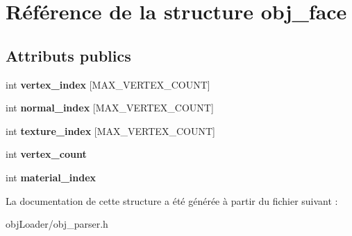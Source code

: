 \hypertarget{structobj__face}{\section{Référence de la structure obj\-\_\-face}
\label{structobj__face}
}
\subsection*{Attributs publics}
\begin{DoxyCompactItemize}
\item 
\hypertarget{structobj__face_a507982facfb73bcd3143d962e8aba781}{int {\bfseries vertex\-\_\-index} \mbox{[}M\-A\-X\-\_\-\-V\-E\-R\-T\-E\-X\-\_\-\-C\-O\-U\-N\-T\mbox{]}}\label{structobj__face_a507982facfb73bcd3143d962e8aba781}

\item 
\hypertarget{structobj__face_aa37ed96ceb21dde7ca0e07436f0c60bd}{int {\bfseries normal\-\_\-index} \mbox{[}M\-A\-X\-\_\-\-V\-E\-R\-T\-E\-X\-\_\-\-C\-O\-U\-N\-T\mbox{]}}\label{structobj__face_aa37ed96ceb21dde7ca0e07436f0c60bd}

\item 
\hypertarget{structobj__face_affde6e39f099c5f3497c3691ea66608c}{int {\bfseries texture\-\_\-index} \mbox{[}M\-A\-X\-\_\-\-V\-E\-R\-T\-E\-X\-\_\-\-C\-O\-U\-N\-T\mbox{]}}\label{structobj__face_affde6e39f099c5f3497c3691ea66608c}

\item 
\hypertarget{structobj__face_ac1a658f759cfb36b241a013cce1a8744}{int {\bfseries vertex\-\_\-count}}\label{structobj__face_ac1a658f759cfb36b241a013cce1a8744}

\item 
\hypertarget{structobj__face_ab354e6f87c96bd040a9cd6d4c4532f6b}{int {\bfseries material\-\_\-index}}\label{structobj__face_ab354e6f87c96bd040a9cd6d4c4532f6b}

\end{DoxyCompactItemize}


La documentation de cette structure a été générée à partir du fichier suivant \-:\begin{DoxyCompactItemize}
\item 
obj\-Loader/obj\-\_\-parser.\-h\end{DoxyCompactItemize}
